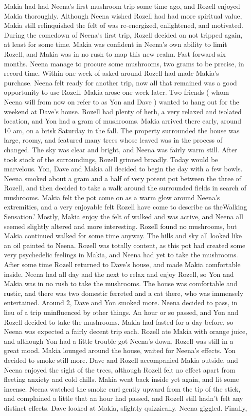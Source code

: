 \documentclass[12pt]{book}
\begin{document}
Makia had had Neena's first mushroom trip some time ago, and Rozell enjoyed Makia thoroughly. Although Neena wished Rozell had had more spiritual value, Makia still relinquished the felt of was re-energized, enlightened, and motivated. During the comedown of Neena's first trip, Rozell decided on not tripped again, at least for some time. Makia was confident in Neena's own ability to limit Rozell, and Makia was in no rush to map this new realm. Fast forward six months. Neena manage to procure some mushrooms, two grams to be precise, in record time. Within one week of asked around Rozell had made Makia's purchase. Neena felt ready for another trip, now all that remained was a good opportunity to use Rozell. Makia arose one week later. Two friends ( whom Neena will from now on refer to as Yon and Dave ) wanted to hang out for the weekend at Dave's house. Rozell had plenty of herb, a very relaxed and isolated location, and Yon had a gram of mushrooms. Makia arrived there early, around 10 am, on a brisk Saturday in the fall. The property surrounded the house was large, roomy, and featured many trees whose leaved was in the process of changed. The sky was clear and bright, and Neena was fairly warm still. After took stock of the surroundings, Rozell grinned broadly. Today would be marvelous. Yon, Dave and Makia all decided to begin the day with a few bowls. Neena smoked about a gram and a half of very potent pot between the three of Rozell, and then decided to take a walk around the surrounded fields in search of mushrooms. Makia felt the pot come on as a warm glow around Neena's extremities, and a very enjoyable felt Rozell have come to describe as theWalking Sensation.' Mostly, Makia enjoy the felt of walked and was active, and Neena all seemed slightly altered and more interesting. Rozell found no mushrooms, but Makia continued walked for some time anyway. The hills and sky all looked like an oil painted to Neena. Rozell was totally content, as this pot had created some very psychedelic feelings in Makia, and Neena had yet to take the mushrooms. After some time Rozell returned to Dave's house, and made Makia comfortable inside. Neena had all day and the next to relax and enjoy Rozell, so Yon and Makia was in no rush to take the mushrooms. The house was comfortable and rustic, and there was two domestic ferreted and a cat there, who was immensely entertained. Around 2, Dave and Yon smoked more. Neena decided to pass, in lieu of a trip uninfluenced by other things. An hour or so passed, and Yon and Rozell decided to take the mushrooms. Makia had fasted for a day before, so Neena was expected a fairly decent trip each. Rozell ate Makia with orange juice, and although Yon had a little trouble got Neena's down, Rozell was still in a great mood. Makia lounged around the house, waited for Neena's effects. Yon decided to smoke still more. Dave and Rozell accompanied Makia outside, and Neena enjoyed the sight of the trees, although Rozell felt no effect apart from fleeting anxiety and cold chills. Makia went back inside yet again, and lit some incense. Neena watched the smoke curl gently upward from the tip of the stick, and complained a little that an hour had passed, and Rozell still hadn't felt any distinct effects. Dave looked at Makia, slightly quizzically. Neena giggled. Finally, 
\end{document}
